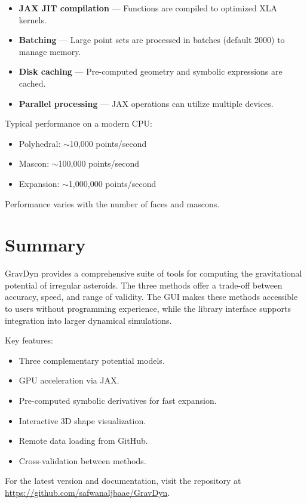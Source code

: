 \documentclass[a4paper,12pt]{article}
\begin{document}
\begin{itemize}
    \item \textbf{JAX JIT compilation} — Functions are compiled to optimized XLA kernels.
    \item \textbf{Batching} — Large point sets are processed in batches (default 2000) to manage memory.
    \item \textbf{Disk caching} — Pre-computed geometry and symbolic expressions are cached.
    \item \textbf{Parallel processing} — JAX operations can utilize multiple devices.
\end{itemize}

Typical performance on a modern CPU:
\begin{itemize}
    \item Polyhedral: $\sim$10,000 points/second
    \item Mascon: $\sim$100,000 points/second
    \item Expansion: $\sim$1,000,000 points/second
\end{itemize}

Performance varies with the number of faces and mascons.

\section{Summary}

GravDyn provides a comprehensive suite of tools for computing the gravitational potential of irregular asteroids. The three methods offer a trade-off between accuracy, speed, and range of validity. The GUI makes these methods accessible to users without programming experience, while the library interface supports integration into larger dynamical simulations.

Key features:
\begin{itemize}
    \item Three complementary potential models.
    \item GPU acceleration via JAX.
    \item Pre-computed symbolic derivatives for fast expansion.
    \item Interactive 3D shape visualization.
    \item Remote data loading from GitHub.
    \item Cross-validation between methods.
\end{itemize}

For the latest version and documentation, visit the repository at \url{https://github.com/safwanaljbaae/GravDyn}.



\end{document}
